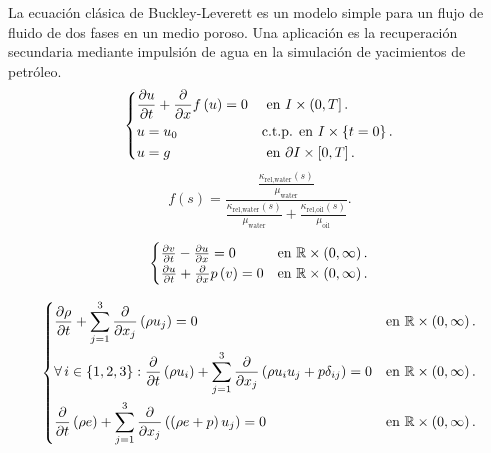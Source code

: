 \begin{example}%
	La ecuación clásica de
	Buckley-Leverett
	es un modelo simple para un flujo de fluido de dos fases en un medio
	poroso.
	Una aplicación es la recuperación secundaria mediante impulsión de
	agua en la simulación de yacimientos de petróleo.
	\begin{equation}
		\begin{dcases}
			\diffp{u}{t}+
			\diffp{}{x}
			f\left(u\right)=0 &
			\text{ en }I\times\left(0,T\right].         \\
			u=u_{0}           &
			\text{c.t.p. en }I\times\left\{t=0\right\}. \\
			u=g               &
			\text{ en }\partial I\times\left[0,T\right].
		\end{dcases}
	\end{equation}
	\begin{equation*}
		f\left(s\right)=
		\frac{\frac{\kappa_{\text{rel,water}}\left(s\right)}{\mu_{\text{water}}}}{
			\frac{\kappa_{\text{rel,water}}\left(s\right)}{\mu_{\text{water}}}+
			\frac{\kappa_{\text{rel,oil}}\left(s\right)}{\mu_{\text{oil}}}
		}.
	\end{equation*}
\end{example}

\begin{example}[$p$-sistema]
	\begin{equation*}
		\begin{cases}
			\diffp{v}{t}-\diffp{u}{x}=0               &
			\text{en }\mathbb{R}\times\left(0,\infty\right). \\
			\diffp{u}{t}+\diffp{}{x}p\left(v\right)=0 &
			\text{en }\mathbb{R}\times\left(0,\infty\right).
		\end{cases}
	\end{equation*}
\end{example}


\begin{example}
	\begin{equation*}
		\begin{dcases}
			\diffp{\rho}{t}+
			\sum_{j=1}^{3}
			\diffp{}{x_{j}}
			\left(\rho u_{j}\right)=0                   &
			\text{en }\mathbb{R}\times\left(0,\infty\right). \\
			\forall i\in\left\{1,2,3\right\}:
			\diffp{}{t}
			\left(\rho u_{i}\right)+
			\sum_{j=1}^{3}
			\diffp{}{x_{j}}
			\left(\rho u_{i}u_{j}+p\delta_{ij}\right)=0 &
			\text{en }\mathbb{R}\times\left(0,\infty\right). \\
			\diffp{}{t}
			\left(\rho e\right)+
			\sum_{j=1}^{3}
			\diffp{}{x_{j}}
			\left(\left(\rho e+p\right)u_{j}\right)=0   &
			\text{en }\mathbb{R}\times\left(0,\infty\right).
		\end{dcases}
	\end{equation*}
\end{example}


